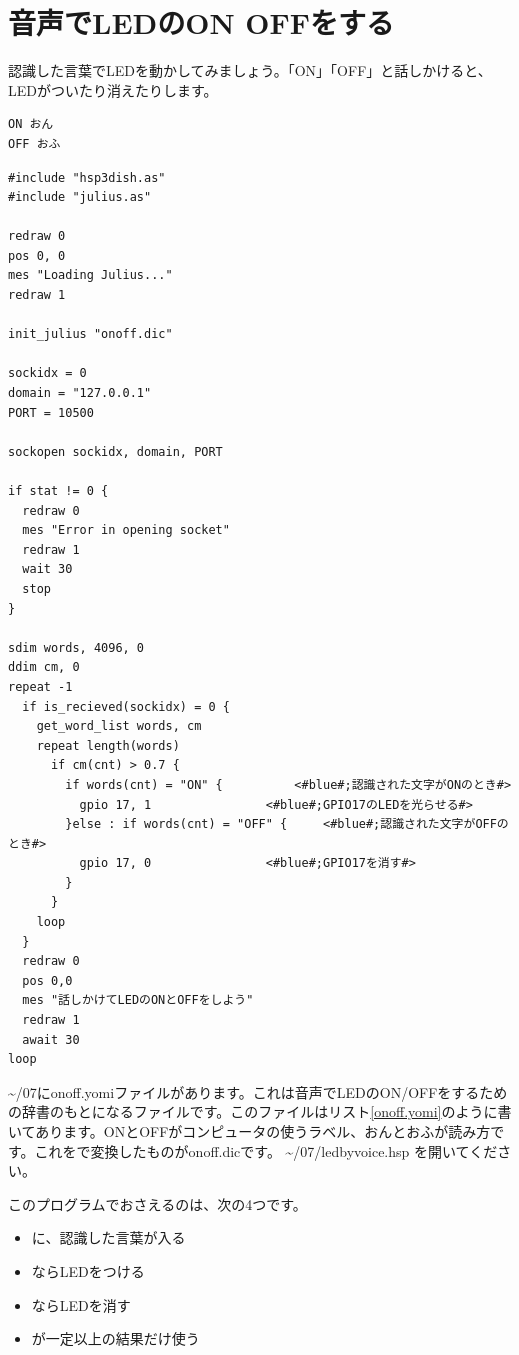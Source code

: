 \documentclass[text06.tex]{subfiles}
\begin{document}
\newpage
\section{音声でLEDのON OFFをする}

認識した言葉でLEDを動かしてみましょう。「ON」「OFF」と話しかけると、LEDがついたり消えたりします。

\begin{lstlisting}[caption=onoff.yomi,label=onoff.yomi,aboveskip=0.4em,belowskip=0.3em]
ON おん
OFF おふ
\end{lstlisting}

\enlargethispage{3\baselineskip}
\begin{lstlisting}[caption=ledbyvoice.hsp,label=ledbyvoice.hsp,aboveskip=0.4em,belowskip=0.2em]
#include "hsp3dish.as"
#include "julius.as"

redraw 0
pos 0, 0
mes "Loading Julius..."
redraw 1

init_julius "onoff.dic"

sockidx = 0
domain = "127.0.0.1"
PORT = 10500

sockopen sockidx, domain, PORT

if stat != 0 {
  redraw 0
  mes "Error in opening socket"
  redraw 1
  wait 30
  stop
}

sdim words, 4096, 0
ddim cm, 0
repeat -1
  if is_recieved(sockidx) = 0 {
    get_word_list words, cm
    repeat length(words)
      if cm(cnt) > 0.7 {
        if words(cnt) = "ON" {			<#blue#;認識された文字がONのとき#>
          gpio 17, 1				<#blue#;GPIO17のLEDを光らせる#>
        }else : if words(cnt) = "OFF" {		<#blue#;認識された文字がOFFのとき#>
          gpio 17, 0				<#blue#;GPIO17を消す#>
        }
      }
    loop
  }
  redraw 0
  pos 0,0
  mes "話しかけてLEDのONとOFFをしよう"
  redraw 1
  await 30
loop
\end{lstlisting}

 \textasciitilde /07に\mbox{onoff.yomi}ファイルがあります。これは音声でLEDのON/OFFをするための辞書のもとになるファイルです。このファイルはリスト\ref{onoff.yomi}のように書いてあります。ONとOFFがコンピュータの使うラベル、おんとおふが読み方です。これを\mbox{}で変換したものが\mbox{onoff.dic}です。 \textasciitilde /07/\mbox{ledbyvoice.hsp} を開いてください。

このプログラムでおさえるのは、次の4つです。

\begin{itemize}
\item {} に、認識した言葉が入る
\item {} ならLEDをつける
\item {} ならLEDを消す
\item {} が一定以上の結果だけ使う
\end{itemize}
\end{document}
